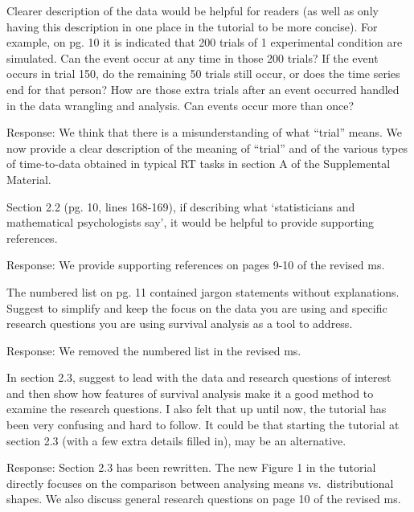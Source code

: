\documentclass[
]{article}
\renewenvironment{quote}{\begin{leftbar}}{\end{leftbar}}
\begin{document}
\begin{quote}
Clearer description of the data would be helpful for readers (as well as
only having this description in one place in the tutorial to be more
concise). For example, on pg. 10 it is indicated that 200 trials of 1
experimental condition are simulated. Can the event occur at any time in
those 200 trials? If the event occurs in trial 150, do the remaining 50
trials still occur, or does the time series end for that person? How are
those extra trials after an event occurred handled in the data wrangling
and analysis. Can events occur more than once?
\end{quote}

Response: We think that there is a misunderstanding of what ``trial''
means. We now provide a clear description of the meaning of ``trial''
and of the various types of time-to-data obtained in typical RT tasks in
section A of the Supplemental Material.

\begin{quote}
Section 2.2 (pg. 10, lines 168-169), if describing what `statisticians
and mathematical psychologists say', it would be helpful to provide
supporting references.
\end{quote}

Response: We provide supporting references on pages 9-10 of the revised
ms.

\begin{quote}
The numbered list on pg. 11 contained jargon statements without
explanations. Suggest to simplify and keep the focus on the data you are
using and specific research questions you are using survival analysis as
a tool to address.
\end{quote}

Response: We removed the numbered list in the revised ms.

\begin{quote}
In section 2.3, suggest to lead with the data and research questions of
interest and then show how features of survival analysis make it a good
method to examine the research questions. I also felt that up until now,
the tutorial has been very confusing and hard to follow. It could be
that starting the tutorial at section 2.3 (with a few extra details
filled in), may be an alternative.
\end{quote}

Response: Section 2.3 has been rewritten. The new Figure 1 in the
tutorial directly focuses on the comparison between analysing means
vs.~distributional shapes. We also discuss general research questions on
page 10 of the revised ms.
\end{document}
